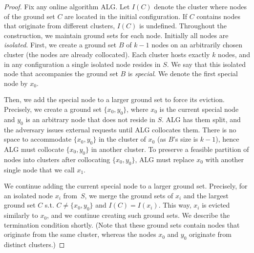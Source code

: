 \documentclass[a4paper,anonymous,USenglish]{lipics-v2019}
\newcommand{\ALG}{\textsf{ALG}\xspace}
\begin{document}
\begin{proof}
	Fix any online algorithm \ALG{}.
	Let $I(C)$ denote the cluster where nodes of the ground set $C$ are located in the initial configuration.
	If $C$ contains nodes that originate from different clusters, $I(C)$ is undefined.
	Throughout the construction, we maintain ground sets for each node.
	Initially all nodes are \emph{isolated}.
	First, we create a ground set $B$ of $k-1$ nodes on an arbitrarily chosen cluster (the nodes  are already collocated).
	Each cluster hosts exactly $k$ nodes, and in any configuration a single isolated node resides in $S$.
	We say that this isolated node that accompanies the ground set $B$ is \emph{special}.
	We denote the first special node by $x_0$.

	Then, we add the special node to a larger ground set to force its eviction.
	Precisely,
	we create a ground set $\{x_0, y_0\}$, 
	where $x_0$ is the current special node and $y_0$ is an arbitrary node that does not reside in $S$.
	\ALG has them split, and the adversary issues external requests until \ALG collocates them.
	There is no space to accommodate $\{x_0, y_0\}$ in the cluster of $x_0$ (as $B$'s size is $k-1$), hence \ALG must collocate $\{x_0, y_0\}$ in another cluster.
	To preserve a feasible partition of nodes into clusters after collocating $\{x_0, y_0\}$,
	\ALG must replace $x_0$ with another single node that we call $x_1$.

	We continue adding the current special node to a larger ground set.
	Precisely, for an isolated node $x_i$ from~$S$, we merge the ground sets of $x_i$ and the largest ground set $C$ s.t. $C \neq \{x_0,y_0\}$ and $I(C) = I(x_i)$.
	This way, $x_i$ is evicted similarly to $x_0$, and we continue creating such ground sets.
	We describe the termination condition shortly.
	(Note that these ground sets contain nodes that originate from the same cluster, whereas the nodes $x_0$ and $y_0$ originate from distinct clusters.)


\end{proof}
\end{document}
